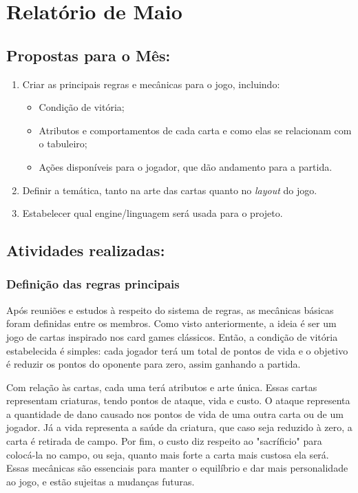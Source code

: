 \section{Relatório de Maio}

\subsection{Propostas para o Mês:}
\begin{enumerate}
    \item Criar as principais regras e mecânicas para o jogo, incluindo:
    \begin{itemize}
        \item Condição de vitória;
        \item Atributos e comportamentos de cada carta e como elas se relacionam com o tabuleiro;
        \item Ações disponíveis para o jogador, que dão andamento para a partida.
    \end{itemize}
    \item Definir a temática, tanto na arte das cartas quanto no \textit{layout} do jogo. 
    \item Estabelecer qual engine/linguagem será usada para o projeto.
\end{enumerate}

\subsection{Atividades realizadas:}

\subsubsection{Definição das regras principais}

Após reuniões e estudos à respeito do sistema de regras, as mecânicas básicas foram definidas entre os membros. Como visto anteriormente, a ideia é ser um jogo de cartas inspirado nos card games clássicos. Então, a condição de vitória estabelecida é simples: cada jogador terá um total de pontos de vida e o objetivo é reduzir os pontos do oponente para zero, assim ganhando a partida. 

Com relação às cartas, cada uma terá atributos e arte única. Essas cartas representam criaturas, tendo pontos de ataque, vida e custo. O ataque representa a quantidade de dano causado nos pontos de vida de uma outra carta ou de um jogador. Já a vida representa a saúde da criatura, que caso seja reduzido à zero, a carta é retirada de campo. Por fim, o custo diz respeito ao "sacríficio" para colocá-la no campo, ou seja, quanto mais forte a carta mais custosa ela será. Essas mecânicas são essenciais para manter o equilíbrio e dar mais personalidade ao jogo, e estão sujeitas a mudanças futuras.

